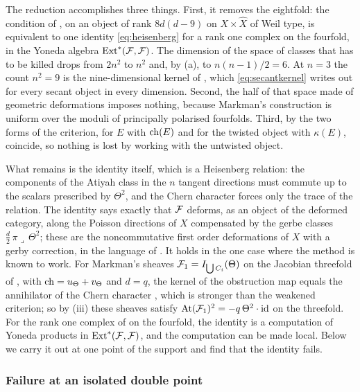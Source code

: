 \begin{remark}\label{rem:factorclosed}
The reduction accomplishes three things. First, it removes the eightfold:
the condition of , on an object of rank $8d(d-9)$ on
$X\times\widehat X$ of Weil type, is equivalent to one identity
\eqref{eq:heisenberg} for a rank one complex on the fourfold, in the Yoneda
algebra $\operatorname{Ext}^{*}(\mathcal{F},\mathcal{F})$. The dimension of the space of classes that has
to be killed drops from $2n^{2}$ to $n^{2}$ and, by (a), to $n(n-1)/2=6$. At
$n=3$ the count $n^{2}=9$ is the nine-dimensional kernel of
\cite[Corollaries 8.3.12 and 8.5.2]{Mar25a}, which \eqref{eq:secantkernel}
writes out for every secant object in every dimension. Second, the half of
that space made of geometric deformations imposes nothing, because Markman's
construction is uniform over the moduli of principally polarised fourfolds.
Third, by  the two forms of the criterion, for $E$ with
$\operatorname{ch}(E)$ and for the twisted object with $\kappa(E)$, coincide, so nothing
is lost by working with the untwisted object.

What remains is the identity itself, which is a Heisenberg relation: the
components of the Atiyah class in the $n$ tangent directions must commute up
to the scalars prescribed by $\Theta^{2}$, and the Chern character forces
only the trace of the relation. The identity says exactly that $\mathcal{F}$
deforms, as an object of the deformed category, along the Poisson directions
of $X$ compensated by the gerbe classes $\tfrac d2\,\pi\lrcorner\,\Theta^{2}$;
these are the noncommutative first order deformations of $X$ with a gerby
correction, in the language of \cite[Section 8.5]{Mar25a}. It holds in the
one case where the method is known to work. For Markman's sheaves
$\mathcal{F}_{1}=I_{\bigcup C_{i}}(\Theta)$ on the Jacobian threefold of
\cite[Section 11.1]{Mar25b}, with $\operatorname{ch}=u_{\Theta}+v_{\Theta}$ and $d=q$, the
kernel of the obstruction map equals the annihilator of the Chern character
\cite[Corollary 8.3.12]{Mar25a}, which is stronger than the weakened
criterion; so by (iii) these sheaves satisfy
$\mathrm{At}(\mathcal{F}_{1})^{2}=-q\,\Theta^{2}\cdot\operatorname{id}$ on the threefold. For the
rank one complex of  on the fourfold, the identity is a
computation of Yoneda products in $\operatorname{Ext}^{*}(\mathcal{F},\mathcal{F})$, and the computation
can be made local. Below we carry it out at one point of the support and
find that the identity fails.
\end{remark}

\subsubsection*{Failure at an isolated double point}

